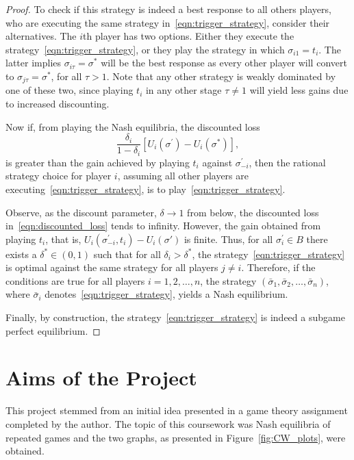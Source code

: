 \begin{proof}
    To check if this strategy is indeed a best response to all others players,
    who are executing the same strategy in~\eqref{eqn:trigger_strategy},
    consider their alternatives. The \(i\)th player has two options. Either
    they execute the strategy~\eqref{eqn:trigger_strategy}, or they play the
    strategy in which \(\sigma_{i1} = t_{i}\). The latter implies \(\sigma_{i\tau} =
    \sigma^{*}\) will be the best response as every other player will convert
    to \(\sigma_{j\tau} = \sigma^{*}\), for all \(\tau > 1\). Note that any
    other strategy is weakly dominated by one of these two, since playing
    \(t_{i}\) in any other stage \(\tau \ne 1\) will yield less gains due to increased discounting.

    Now if, from playing the Nash equilibria, the discounted loss 
    \begin{equation}
        \frac{\delta_{i}}{1-\delta_{i}}[U_{i}(\sigma^{\prime}) -
        U_{i}(\sigma^{*})],
    \end{equation}\label{eqn:discounted_loss}
    is greater than the gain achieved by playing
    \(t_{i}\) against \(\sigma_{-i}^{\prime}\), then the rational
    strategy choice for player \(i\), assuming all other players are
    executing~\eqref{eqn:trigger_strategy}, is to play~\eqref{eqn:trigger_strategy}.
    
    Observe, as the discount parameter, \(\delta \to 1\) from
    below, the discounted loss in~\eqref{eqn:discounted_loss} tends to infinity.
    However, the gain obtained from playing \(t_{i}\), that is,
    \(U_{i}(\sigma_{-i}^{\prime}, t_{i}) - U_{i}(\sigma{\prime})\) is finite.
    Thus, for all \(\sigma_{i}^{\prime} \in B\) there exists a \(\delta^{*} \in
    (0, 1)\) such that for all \(\delta_{i} > \delta^{*}\), the
    strategy~\eqref{eqn:trigger_strategy} is optimal against the same strategy
    for all players \(j \ne i\). Therefore, if the conditions are true for all
    players \(i = 1,2,\ldots,n\), the strategy \((\bar{\sigma}_{1},
    \bar{\sigma}_{2}, \ldots, \bar{\sigma}_{n})\), where  \(\bar{\sigma}_{i}\)
    denotes~\eqref{eqn:trigger_strategy}, yields a Nash equilibrium.

    Finally, by construction, the strategy~\eqref{eqn:trigger_strategy} is
    indeed a subgame perfect equilibrium. 
\end{proof}


\section{Aims of the Project}\label{sec:Aims_of_the_Project}
This project stemmed from an initial idea presented in a game theory assignment
completed by the author. The topic of this coursework was Nash equilibria of
repeated games and the two graphs, as presented in Figure~\ref{fig:CW_plots}, were
obtained.

